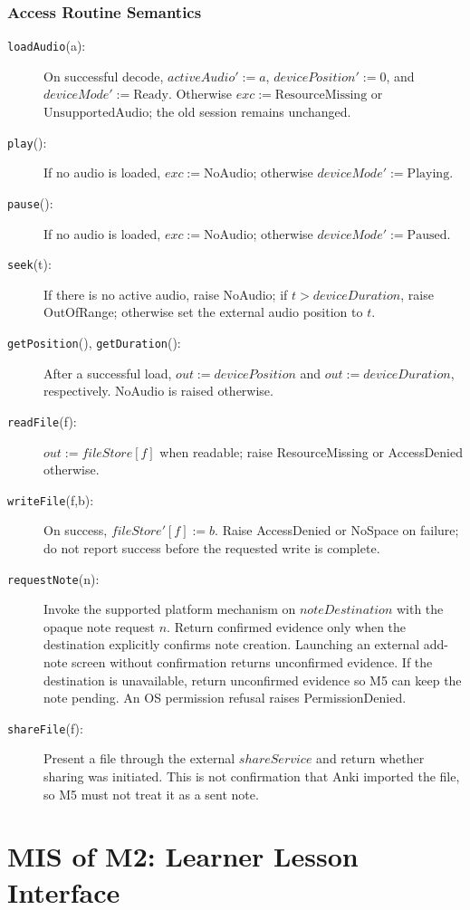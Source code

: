 \documentclass[12pt, titlepage]{article}
\begin{document}
\subsubsection{Access Routine Semantics}
\begin{description}
\item[\texttt{loadAudio}(a):] On successful decode, $activeAudio':=a$,
$devicePosition':=0$, and $deviceMode':=\mathrm{Ready}$.
Otherwise $exc:=\mathrm{ResourceMissing}$ or
$\mathrm{UnsupportedAudio}$; the old session remains unchanged.
\item[\texttt{play}():] If no audio is loaded, $exc:=\mathrm{NoAudio}$;
otherwise $deviceMode':=\mathrm{Playing}$.
\item[\texttt{pause}():] If no audio is loaded, $exc:=\mathrm{NoAudio}$;
otherwise $deviceMode':=\mathrm{Paused}$.
\item[\texttt{seek}(t):] If there is no active audio, raise
NoAudio; if $t>deviceDuration$, raise OutOfRange; otherwise set the
external audio position to $t$.
\item[\texttt{getPosition}(), \texttt{getDuration}():]
After a successful load, $out:=devicePosition$ and
$out:=deviceDuration$, respectively. NoAudio is raised otherwise.
\item[\texttt{readFile}(f):] $out:=fileStore[f]$ when readable;
raise ResourceMissing or AccessDenied otherwise.
\item[\texttt{writeFile}(f,b):] On success, $fileStore'[f]:=b$.
Raise AccessDenied or NoSpace on failure; do not report success
before the requested write is complete.
\item[\texttt{requestNote}(n):] Invoke the supported platform
mechanism on $noteDestination$ with the opaque note request $n$.
Return confirmed evidence only when the destination explicitly
confirms note creation. Launching an external add-note screen
without confirmation returns unconfirmed evidence. If the
destination is unavailable, return unconfirmed evidence so M5
can keep the note pending. An OS permission refusal raises
PermissionDenied.
\item[\texttt{shareFile}(f):] Present a file through the
external $shareService$ and return whether sharing was
initiated. This is not confirmation that Anki imported the
file, so M5 must not treat it as a sent note.
\end{description}

\clearpage
\section{MIS of M2: Learner Lesson Interface} \label{MISM2}
\end{document}
